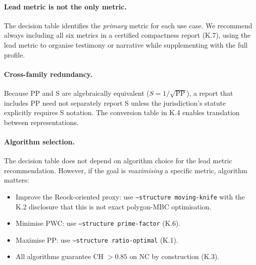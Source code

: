 \paragraph{Lead metric is not the only metric.}
The decision table identifies the \emph{primary} metric for each use case.
We recommend always including all six metrics in a certified compactness report
(K.7), using the lead metric to organise testimony or narrative while
supplementing with the full profile.

\paragraph{Cross-family redundancy.}
Because PP and S are algebraically equivalent ($S = 1/\sqrt{\text{PP}}$),
a report that includes PP need not separately report S unless the jurisdiction's
statute explicitly requires S notation. The conversion table in K.4 enables
translation between representations.

\paragraph{Algorithm selection.}
The decision table does not depend on algorithm choice for the lead metric
recommendation. However, if the goal is \emph{maximising} a specific metric,
algorithm matters:
\begin{itemize}
  \item Improve the Reock-oriented proxy: use \texttt{--structure moving-knife}
    with the K.2 disclosure that this is not exact polygon-MBC optimisation.
  \item Minimise PWC: use \texttt{--structure prime-factor} (K.6).
  \item Maximise PP: use \texttt{--structure ratio-optimal} (K.1).
  \item All algorithms guarantee CH $> 0.85$ on NC by construction (K.3).
\end{itemize}
